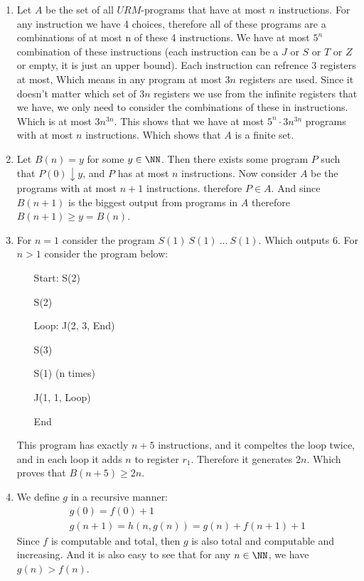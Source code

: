 \begin{enumerate}[label=\ilabel]
    \item 
        Let $A$ be the set of all $URM$-programs that have at most $n$ instructions.
        For any instruction we have 4 choices, therefore all of these programs are a combinations of at most n of these 4 instructions. We have at most $5^n$ combination of these instructions (each instruction can be a $J$ or $S$ or $T$ or $Z$ or empty, it is just an upper bound). Each instruction can refrence 3 registers at most, Which means in any program at most $3n$ registers are used.
        Since it doesn't matter which set of $3n$ registers we use from the infinite registers that we have, we only need to consider the combinations of these in instructions. Which is at most $3n^{3n}$. This shows that we have at most $5^n \cdot 3n^{3n}$ programs with at most $n$ instructions. Which shows that $A$ is a finite set.
    
    \item
        Let $B(n) = y$ for some $y \in \NN$. Then there exists some program $P$ such that $P(0) \downarrow y$, and $P$ has at most $n$ instructions. Now consider $A$ be the programs with at most $n + 1$ instructions. therefore $P \in A$. And since $B(n + 1)$ is the biggest output from programs in $A$ therefore $B(n + 1) \ge y = B(n)$.

    \item
        For $n = 1$ consider the program $S(1) \ S(1) \ \dots \ S(1)$. Which outputs 6.
        For $n > 1$ consider the program below:
        \begin{itemize}
            \item[Start:] S(2)
            \item[]       S(2)
            \item[Loop:] J(2, 3, End)
            \item[] S(3)
            \item[] S(1) (n times)
            \item[] J(1, 1, Loop)
            \item[End] 
        \end{itemize}
        This program has exactly $n + 5$ instructions, and it compeltes the loop twice, and in each loop it adds $n$ to register $r_1$. Therefore it generates $2n$. Which proves that $B(n + 5) \ge 2n$.

    \item
        We define $g$ in a recursive manner:
        \begin{gather*}
            g(0) = f(0) + 1\\
            g(n + 1) = h(n, g(n)) = g(n) + f(n + 1) + 1
        \end{gather*}
        Since $f$ is computable and total, then $g$ is also total and computable and increasing. And it is also easy to see that for any $n \in \NN$, we have $g(n) > f(n)$.
    

\end{enumerate}
